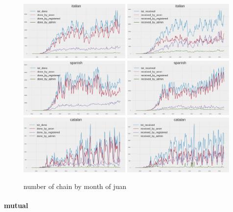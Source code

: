 \begin{figure}[H]
    \centering
    \includegraphics[width=0.49\textwidth]{./chapters/04/assets/revert_done_it.png}
    \includegraphics[width=0.49\textwidth]{./chapters/04/assets/revert_received_it.png}
    \includegraphics[width=0.49\textwidth]{./chapters/04/assets/revert_done_es.png}
    \includegraphics[width=0.49\textwidth]{./chapters/04/assets/revert_received_es.png}
    \includegraphics[width=0.49\textwidth]{./chapters/04/assets/revert_done_ca.png}
    \includegraphics[width=0.49\textwidth]{./chapters/04/assets/revert_received_ca.png}
    \caption{number of chain by month of juan}
    \label{fig:revuser}
\end{figure}
\paragraph*{mutual}






